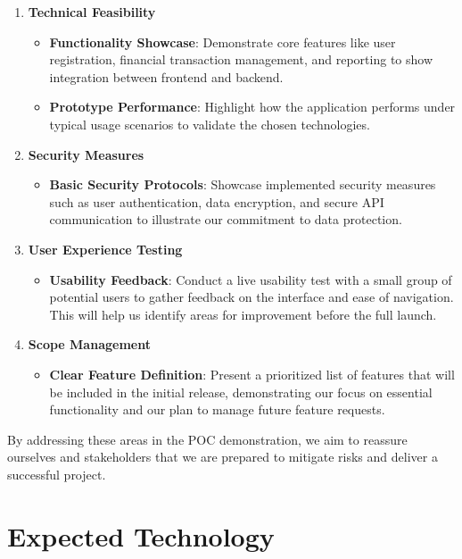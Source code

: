 \documentclass{article}
\begin{document}
\begin{enumerate}[label=\arabic*.]
    \item \textbf{Technical Feasibility}
    \begin{itemize}
        \item \textbf{Functionality Showcase}: Demonstrate core features like user registration, financial transaction management, and reporting to show integration between frontend and backend.
        \item \textbf{Prototype Performance}: Highlight how the application performs under typical usage scenarios to validate the chosen technologies.
    \end{itemize}

    \item \textbf{Security Measures}
    \begin{itemize}
        \item \textbf{Basic Security Protocols}: Showcase implemented security measures such as user authentication, data encryption, and secure API communication to illustrate our commitment to data protection.
    \end{itemize}

    \item \textbf{User Experience Testing}
    \begin{itemize}
        \item \textbf{Usability Feedback}: Conduct a live usability test with a small group of potential users to gather feedback on the interface and ease of navigation. This will help us identify areas for improvement before the full launch.
    \end{itemize}

    \item \textbf{Scope Management}
    \begin{itemize}
        \item \textbf{Clear Feature Definition}: Present a prioritized list of features that will be included in the initial release, demonstrating our focus on essential functionality and our plan to manage future feature requests.
    \end{itemize}
\end{enumerate}

By addressing these areas in the POC demonstration, we aim to reassure ourselves and stakeholders that we are prepared to mitigate risks and deliver a successful project.


\section{Expected Technology}
\end{document}
